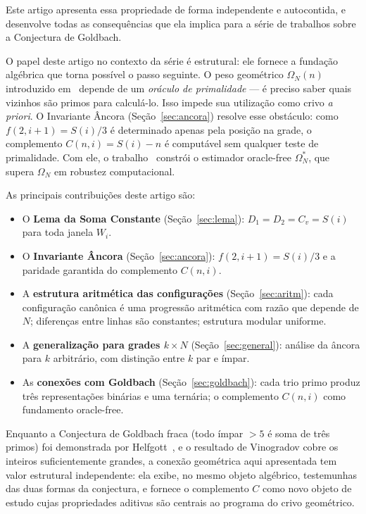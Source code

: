 \documentclass[12pt, a4paper]{article}
\begin{document}
	Este artigo apresenta essa propriedade de forma independente e autocontida, e
	desenvolve todas as consequências que ela implica para a série de trabalhos sobre a
	Conjectura de Goldbach.
	
	\medskip
	
	O papel deste artigo no contexto da série é estrutural: ele fornece a fundação
	algébrica que torna possível o passo seguinte. O peso geométrico $\Omega_N(n)$
	introduzido em~\cite{bandeira2026} depende de um \textit{oráculo de primalidade} —
	é preciso saber quais vizinhos são primos para calculá-lo. Isso impede sua utilização
	como crivo \textit{a priori}. O Invariante Âncora (Seção~\ref{sec:ancora}) resolve
	esse obstáculo: como $f(2,i{+}1)=S(i)/3$ é determinado apenas pela posição na grade, o
	complemento $C(n,i)=S(i)-n$ é computável sem qualquer teste de primalidade. Com ele,
	o trabalho~\cite{bandeira2026c} constrói o estimador oracle-free $\Omega^*_N$, que
	supera $\Omega_N$ em robustez computacional.
	
	\medskip
	
	As principais contribuições deste artigo são:
	\begin{itemize}
		\item O \textbf{Lema da Soma Constante} (Seção~\ref{sec:lema}): $D_1=D_2=C_v=S(i)$
		para toda janela $W_i$.
		\item O \textbf{Invariante Âncora} (Seção~\ref{sec:ancora}): $f(2,i{+}1)=S(i)/3$
		e a paridade garantida do complemento $C(n,i)$.
		\item A \textbf{estrutura aritmética das configurações} (Seção~\ref{sec:aritm}):
		cada configuração canônica é uma progressão aritmética com razão que depende
		de $N$; diferenças entre linhas são constantes; estrutura modular uniforme.
		\item A \textbf{generalização para grades $k\times N$} (Seção~\ref{sec:general}):
		análise da âncora para $k$ arbitrário, com distinção entre $k$ par e ímpar.
		\item As \textbf{conexões com Goldbach} (Seção~\ref{sec:goldbach}): cada trio primo
		produz três representações binárias e uma ternária; o complemento $C(n,i)$
		como fundamento oracle-free.
	\end{itemize}
	
	\medskip
	
	Enquanto a Conjectura de Goldbach fraca (todo ímpar $>5$ é soma de três primos) foi
	demonstrada por Helfgott~\cite{helfgott2013}, e o resultado de Vinogradov cobre os
	inteiros suficientemente grandes, a conexão geométrica aqui apresentada tem valor
	estrutural independente: ela exibe, no mesmo objeto algébrico, testemunhas das duas
	formas da conjectura, e fornece o complemento $C$ como novo objeto de estudo cujas
	propriedades aditivas são centrais ao programa do crivo geométrico.
	
\end{document}
